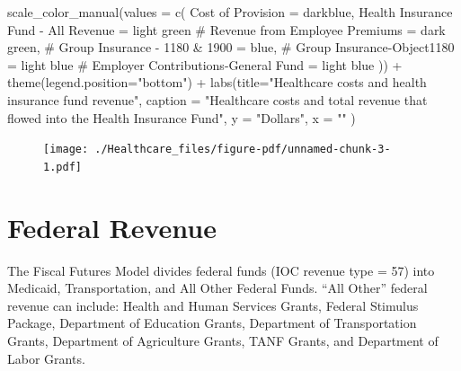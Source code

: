 \documentclass[
  letterpaper,
  DIV=11,
  numbers=noendperiod]{scrreport}
\newenvironment{Shaded}{\begin{snugshade}}{\end{snugshade}}
\newcommand{\AttributeTok}[1]{\textcolor[rgb]{0.40,0.45,0.13}{#1}}
\newcommand{\CommentTok}[1]{\textcolor[rgb]{0.37,0.37,0.37}{#1}}
\newcommand{\FunctionTok}[1]{\textcolor[rgb]{0.28,0.35,0.67}{#1}}
\newcommand{\NormalTok}[1]{\textcolor[rgb]{0.00,0.23,0.31}{#1}}
\newcommand{\OtherTok}[1]{\textcolor[rgb]{0.00,0.23,0.31}{#1}}
\newcommand{\SpecialCharTok}[1]{\textcolor[rgb]{0.37,0.37,0.37}{#1}}
\newcommand{\StringTok}[1]{\textcolor[rgb]{0.13,0.47,0.30}{#1}}
\begin{document}
\begin{Shaded}
\begin{Highlighting}[]
  \FunctionTok{scale\_color\_manual}\NormalTok{(}\AttributeTok{values =} \FunctionTok{c}\NormalTok{(}
    \StringTok{\textquotesingle{}Cost of Provision\textquotesingle{}} \OtherTok{=} \StringTok{\textquotesingle{}darkblue\textquotesingle{}}\NormalTok{,}
    \StringTok{\textquotesingle{}Health Insurance Fund {-} All Revenue\textquotesingle{}} \OtherTok{=} \StringTok{\textquotesingle{}light green\textquotesingle{}}
  \CommentTok{\#  \textquotesingle{}Revenue from Employee Premiums\textquotesingle{} = \textquotesingle{}dark green\textquotesingle{},}
  \CommentTok{\#  \textquotesingle{}Group Insurance {-} 1180 \& 1900\textquotesingle{} = \textquotesingle{}blue\textquotesingle{},}
  \CommentTok{\#  \textquotesingle{}Group Insurance{-}Object1180\textquotesingle{} = \textquotesingle{}light blue\textquotesingle{}}
   \CommentTok{\#     \textquotesingle{}Employer Contributions{-}General Fund\textquotesingle{} = \textquotesingle{}light blue\textquotesingle{}}
\NormalTok{)) }\SpecialCharTok{+}
  \FunctionTok{theme}\NormalTok{(}\AttributeTok{legend.position=}\StringTok{"bottom"}\NormalTok{) }\SpecialCharTok{+}
  \FunctionTok{labs}\NormalTok{(}\AttributeTok{title=}\StringTok{"Healthcare costs and health insurance fund revenue"}\NormalTok{, }
       \AttributeTok{caption =} \StringTok{"Healthcare costs and total revenue that flowed into the Health Insurance Fund"}\NormalTok{, }
       \AttributeTok{y =} \StringTok{"Dollars"}\NormalTok{, }\AttributeTok{x =} \StringTok{""}\NormalTok{ )}
\end{Highlighting}
\end{Shaded}

\begin{figure}[H]

{\centering \texttt{[image: ./Healthcare\_files/figure-pdf/unnamed-chunk-3-1.pdf]}

}

\end{figure}


\hypertarget{federal-revenue}{%
\chapter{Federal Revenue}\label{federal-revenue}}

The Fiscal Futures Model divides federal funds (IOC revenue type = 57)
into Medicaid, Transportation, and All Other Federal Funds. ``All
Other'' federal revenue can include: Health and Human Services Grants,
Federal Stimulus Package, Department of Education Grants, Department of
Transportation Grants, Department of Agriculture Grants, TANF Grants,
and Department of Labor Grants.
\end{document}
